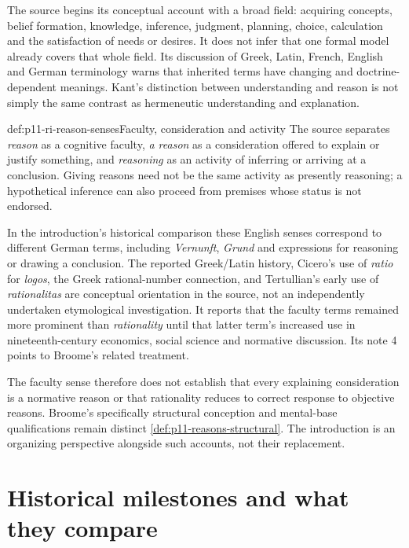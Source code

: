 The source begins its conceptual account with a broad field: acquiring
concepts, belief formation, knowledge, inference, judgment, planning,
choice, calculation and the satisfaction of needs or desires. It does
not infer that one formal model already covers that whole field.
Its discussion of Greek, Latin, French, English and German terminology
warns that inherited terms have changing and doctrine-dependent meanings.
Kant's distinction between understanding and reason is not simply the
same contrast as hermeneutic understanding and explanation.

\begin{hbdefinition}{def:p11-ri-reason-senses}{Faculty, consideration and activity}
The source separates \emph{reason} as a cognitive faculty,
\emph{a reason} as a consideration offered to explain or justify
something, and \emph{reasoning} as an activity of inferring or
arriving at a conclusion. Giving reasons need not be the same
activity as presently reasoning; a hypothetical inference can also
proceed from premises whose status is not endorsed.

In the introduction's historical comparison these English senses
correspond to different German terms, including \emph{Vernunft},
\emph{Grund} and expressions for reasoning or drawing a conclusion.
The reported Greek/Latin history, Cicero's use of \emph{ratio} for
\emph{logos}, the Greek rational-number connection, and Tertullian's
early use of \emph{rationalitas} are conceptual
orientation in the source, not an independently undertaken etymological
investigation. It reports that the faculty terms remained more prominent
than \emph{rationality} until that latter term's increased use in
nineteenth-century economics, social science and normative discussion.
Its note 4 points to Broome's related treatment.
\cite[pp.~3--4 and notes~3--4]{KnauffSpohn2021FrameworksIntro}
\end{hbdefinition}

The faculty sense therefore does not establish that every explaining
consideration is a normative reason or that rationality reduces to
correct response to objective reasons. Broome's specifically structural
conception and mental-base qualifications remain distinct
\cref{def:p11-reasons-structural}. The introduction is an organizing
perspective alongside such accounts, not their replacement.

\section{Historical milestones and what they compare}

